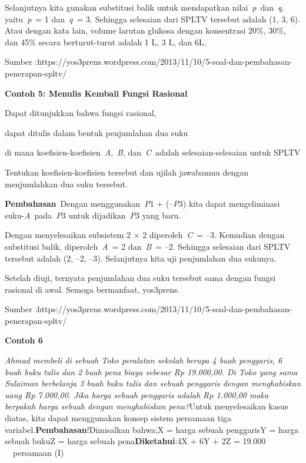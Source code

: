\documentclass[11pt,fleqn]{book} %
\begin{document}
\noindent 

\noindent Selanjutnya kita gunakan substitusi balik untuk mendapatkan nilai~\textit{p}~dan~\textit{q}, yaitu~\textit{p}~= 1 dan~\textit{q}~= 3. Sehingga selesaian dari SPLTV tersebut adalah (1, 3, 6). Atau dengan kata lain, volume larutan glukosa dengan konsentrasi 20\%, 30\%, dan 45\% secara berturut-turut adalah 1 L, 3 L, dan 6L.

\noindent Sumber :https://yos3prens.wordpress.com/2013/11/10/5-soal-dan-pembahasan-penerapan-spltv/

\noindent 

\noindent \textbf{Contoh 5: Menulis Kembali Fungsi Rasional}

\noindent Dapat ditunjukkan bahwa fungsi rasional,

\noindent 

\noindent dapat ditulis dalam bentuk penjumlahan dua suku

\noindent 

\noindent di mana koefisien-koefisien~\textit{A},~\textit{B}, dan~\textit{C}~adalah selesaian-selesaian untuk SPLTV

\noindent 

\noindent Tentukan koefisien-koefisien tersebut dan ujilah jawabanmu dengan menjumlahkan dua suku tersebut.

\noindent 

\noindent \textbf{Pembahasan}~Dengan menggunakan~\textit{P}1 + (--\textit{P}3) kita dapat mengeliminasi suku-\textit{A}~pada~\textit{P}3 untuk dijadikan~\textit{P}3 yang baru.

\noindent 

\noindent 

\noindent Dengan menyelesaikan subsistem 2 $\times$ 2 diperoleh~\textit{C}~= --3. Kemudian dengan substitusi balik, diperoleh~\textit{A}~= 2 dan~\textit{B}~= --2. Sehingga selesaian dari SPLTV tersebut adalah (2, --2, --3). Selanjutnya kita uji penjumlahan dua sukunya.

\noindent 

\noindent Setelah diuji, ternyata penjumlahan dua suku tersebut sama dengan fungsi rasional di awal. Semoga bermanfaat, yos3prens.

\noindent Sumber :https://yos3prens.wordpress.com/2013/11/10/5-soal-dan-pembahasan-penerapan-spltv/

\noindent 

\noindent \textbf{Contoh 6}

\noindent \textit{Ahmad membeli di sebuah Toko peralatan sekolah berupa 4 buah penggaris, 6 buah buku tulis dan 2 buah pena biaya sebesar Rp 19.000,00. Di Toko yang sama Sulaiman berbelanja 3 buah buku tulis dan sebuah penggaris dengan menghabiskan uang Rp 7.000,00. Jika harga sebuah penggaris adalah Rp 1.000,00 maka berpakah harga sebuah dengan menghabiskan pena?}Untuk menyelesaikan kasus diatas, kita dapat menggunakan konsep sistem persamaan tiga variabel.\textbf{Pembahasan}!Dimisalkan bahwa;X = harga sebuah penggarisY = harga sebuah bukuZ = harga sebuah pena\textbf{Diketahui}:4X + 6Y + 2Z      = 19.000 ~ ~~persamaan (I)
\end{document}

